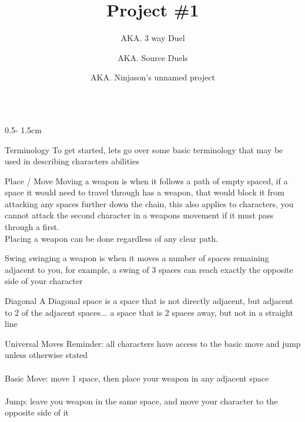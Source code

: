 \documentclass{uioposter}
\title{Project \#1}
\author
{%
    AKA. 3 way Duel
    \and
    AKA. Source Duels
    \and
    AKA. Ninjason's unnamed project
}
\institute
{
    3 Players
    \and
    5-10 minutes
    \and
    ages 10?+ idk
}
\begin{document}
\begin{frame}
\begin{columns}[onlytextwidth]


\begin{column}{0.5\textwidth - 1.5cm}

    \begin{block}{Terminology}
        To get started, lets go over some basic terminology that may be used in describing characters abilities
        \vspace{2ex}
        \begin{block}{Place / Move}
            Moving a weapon is when it follows a path of empty spaced, if a space it would need to travel through has a weapon, that would block it from attacking any spaces further down the chain, this also applies to characters, you cannot attack the second character in a weapons movement if it must pass through a first.
            \\
            Placing a weapon can be done regardless of any clear path.
        \end{block}
        \vspace{-3ex}
        \begin{block}{Swing}
            swinging a weapon is when it moves a number of spaces remaining adjacent to you, for example, a swing of 3 spaces can reach exactly the opposite side of your character
        \end{block}
        \vspace{-3ex}
        \begin{block}{Diagonal}
            A Diagonal space is a space that is not directly adjacent, but adjacent to 2 of the adjacent spaces... a space that is 2 spaces away, but not in a straight line
        \end{block}
    \end{block}
    
    \begin{alertblock}{Universal Moves}
        Reminder: all characters have access to the basic move and jump unless otherwise stated
        \\
        \\
        Basic Move: move 1 space, then place your weapon in any adjacent space
        \\
        \\
        Jump: leave you weapon in the same space, and move your character to the opposite side of it
    \end{alertblock}


\end{column}
\end{columns}
\end{frame}
\end{document}
